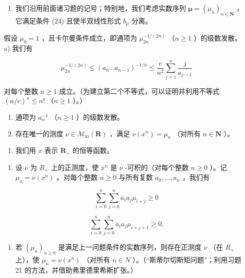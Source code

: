 \begin{enumerate}
\def\labelenumi{\arabic{enumi})}
\setcounter{enumi}{24}
\tightlist
\item
  我们沿用前面诸习题的记号；特别地，我们考虑实数序列 \(\boldsymbol{\mu} = (\mu_{n})_{n \in \mathbf{N}}\) ，它满足条件 (24) 且使半双线性形式 \(b_{\mu}\) 分离。
\end{enumerate}

假设 \(\mu_{0}=1\) ，且卡尔曼条件成立，即通项为 \(\mu_{2n}^{-1/(2n)}\) （\(n\geqslant1\) ）的级数发散。 a) 我们有

\[
\mu_ {2 n} ^ {- 1 / (2 n)} \leqslant (a _ {0} \dots a _ {n - 1}) ^ {- 1 / n} \leqslant \frac {e}{n ^ {2}} \sum_ {j = 1} ^ {n} \frac {j}{a _ {j - 1}}
\]

对每个整数 \(n \geqslant 1\) 成立。（为建立第二个不等式，可以证明并利用不等式 \((n/e)^{n} \leqslant n!\) （\(n \geqslant 1\) ）。）

\begin{enumerate}
\def\labelenumi{\alph{enumi})}
\setcounter{enumi}{1}
\item
  通项为 \(a_{n}^{-1}\) （\(n \geqslant 1\) ）的级数发散。
\item
  存在唯一的测度 \(\nu \in \mathcal{M}_{\mathrm{m}}(\mathbf{R})\) ，满足 \(\nu(x^n) = \mu_n\) （对所有 \(n \in \mathbf{N}\) ）。
\end{enumerate}

\begin{enumerate}
\def\labelenumi{\arabic{enumi})}
\setcounter{enumi}{25}
\tightlist
\item
  我们用 \(x\) 表示 \(\mathbf{R}_{+}\) 的恒等函数。
\end{enumerate}

\begin{enumerate}
\def\labelenumi{\alph{enumi})}
\tightlist
\item
  设 \(\nu\) 为 \(R_{+}\) 上的正测度，使 \(x^{n}\) 是 \(\nu\) -可积的（对每个整数 \(n \geqslant 0\) ）。记 \(\mu_{n} = \nu(x^{n})\) 。对每个整数 \(n \geqslant 0\) 与所有复数 \(a_{0}, \ldots, a_{n}\) ，我们有
\end{enumerate}

\[
\sum_ {i = 0} ^ {n} \sum_ {j = 0} ^ {n} \overline {{a}} _ {i} a _ {j} \mu_ {i + j} \geqslant 0
\]

\[
\sum_ {i = 0} ^ {n} \sum_ {j = 0} ^ {n} \overline {{a}} _ {i} a _ {j} \mu_ {i + j + 1} \geqslant 0.
\]

\begin{enumerate}
\def\labelenumi{\alph{enumi})}
\setcounter{enumi}{1}
\tightlist
\item
  若 \((\mu_{n})_{n\geqslant0}\) 是满足上一问题条件的实数序列，则存在正测度 \(\nu\) （在 \(R_{+}\) 上），使 \(\mu_{n}=\nu(x^{n})\) （对所有 \(n\in N\) ）。（“斯蒂尔切斯矩问题”；利用习题 21 的方法，并借助弗里德里希斯扩张。）
\end{enumerate}

